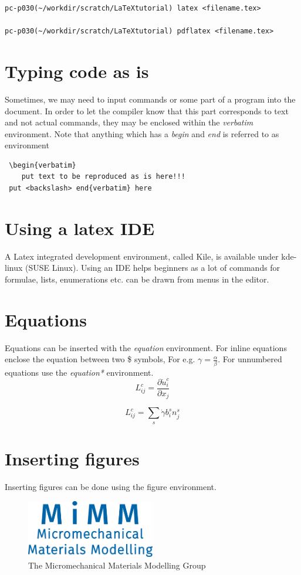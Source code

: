 \documentclass[a4paper,12pt,times]{article} %
\begin{document}
\begin{verbatim}
pc-p030(~/workdir/scratch/LaTeXtutorial) latex <filename.tex>

pc-p030(~/workdir/scratch/LaTeXtutorial) pdflatex <filename.tex>
\end{verbatim}

\section{Typing code as is}
Sometimes, we may need to input commands or some part of a program into the document. In order to let the compiler know that this part corresponds to text and not actual commands, they may be enclosed within the \emph{verbatim} environment. Note that anything which has a \emph{begin} and \emph{end} is referred to as environment

\begin{verbatim}
 \begin{verbatim}
    put text to be reproduced as is here!!!
 put <backslash> end{verbatim} here
\end{verbatim}

\section{Using a latex IDE}
A Latex integrated development environment, called Kile, is available under kde-linux (SUSE Linux). Using an IDE helps beginners as a lot of commands for formulae, lists, enumerations etc. can be drawn from menus in the editor.

\section{Equations}
Equations can be inserted with the \emph{equation} environment. For inline equations enclose the equation between two \$ symbols, For e.g. $\gamma = \frac{\alpha}{\beta}$. For unnumbered equations use the  \emph{equation*} environment.
\begin{equation}
  L^{c}_{ij} = \frac{\partial \dot{u}_{i}^c}{\partial x_j}
\end{equation}

\begin{equation*}
  L^{c}_{ij} = \sum_{s}\dot{\gamma} b^{s}_{i}n^{s}_{j}
\end{equation*}

\newpage
\section{Inserting figures}\label{sec:InsertFig}
Inserting figures can be done using the figure environment.
\begin{figure}[htbp]
  \centering
  \includegraphics[width=0.5\textwidth]{./MiMM_logo_transpBG-2.jpg}
  \caption{The Micromechanical Materials Modelling Group}
  \label{fig:IWMlogo}
\end{figure}
\end{document}
